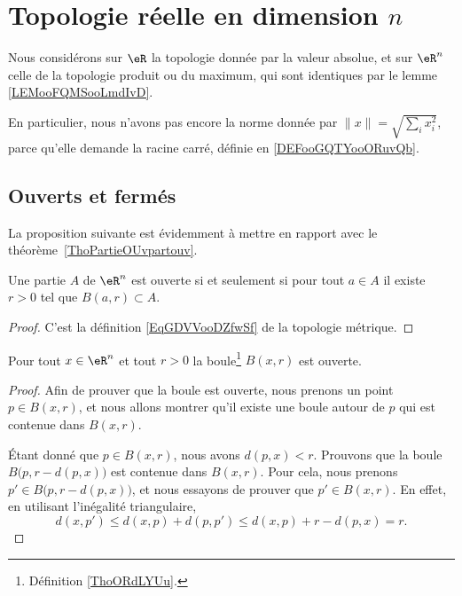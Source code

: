 \section{Topologie réelle en dimension \( n\)}

Nous considérons sur \( \eR\) la topologie donnée par la valeur absolue, et sur \( \eR^n\) celle de la topologie produit ou du maximum, qui sont identiques par le lemme \ref{LEMooFQMSooLmdIvD}.

En particulier, nous n'avons pas encore la norme donnée par \( \| x \|=\sqrt{ \sum_ix_i^2 }\), parce qu'elle demande la racine carré, définie en \ref{DEFooGQTYooORuvQb}.

\subsection{Ouverts et fermés}

La proposition suivante est évidemment à mettre en rapport avec le théorème~\ref{ThoPartieOUvpartouv}.
\begin{proposition}\label{PROPooEQYJooBbPiAj}
	Une partie \( A\) de \( \eR^n\) est ouverte si et seulement si pour tout \( a\in A\) il existe \( r>0\) tel que \( B(a,r)\subset A\).
\end{proposition}

\begin{proof}
    C'est la définition \ref{EqGDVVooDZfwSf} de la topologie métrique.
\end{proof}

\begin{lemma}   \label{LemMESSExh}
	Pour tout \( x \in \eR^n\) et tout \( r >0\) la boule\footnote{Définition \ref{ThoORdLYUu}.} \( B(x,r)\) est ouverte.
\end{lemma}

\begin{proof}
	Afin de prouver que la boule est ouverte, nous prenons un point \( p\in B(x,r)\), et nous allons montrer qu'il existe une boule autour de \( p\) qui est contenue dans \( B(x,r)\).

	Étant donné que \( p\in B(x,r)\), nous avons \( d(p,x)<r\). Prouvons que la boule \( B\big(p,r-d(p,x)\big)\) est contenue dans \( B(x,r)\). Pour cela, nous prenons \( p'\in B\big(p,r-d(p,x)\big)\), et nous essayons de prouver que \( p'\in B(x,r)\). En effet, en utilisant l'inégalité triangulaire,
	\begin{equation}
		d(x,p')\leq d(x,p)+d(p,p')\leq d(x,p)+r-d(p,x)=r.
	\end{equation}
\end{proof}

